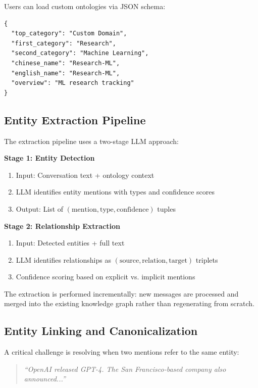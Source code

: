 Users can load custom ontologies via JSON schema:

\begin{verbatim}
{
  "top_category": "Custom Domain",
  "first_category": "Research",
  "second_category": "Machine Learning",
  "chinese_name": "Research-ML",
  "english_name": "Research-ML",
  "overview": "ML research tracking"
}
\end{verbatim}

\subsection{Entity Extraction Pipeline}

The extraction pipeline uses a two-stage LLM approach:

\textbf{Stage 1: Entity Detection}
\begin{enumerate}
    \item Input: Conversation text + ontology context
    \item LLM identifies entity mentions with types and confidence scores
    \item Output: List of $(\text{mention}, \text{type}, \text{confidence})$ tuples
\end{enumerate}

\textbf{Stage 2: Relationship Extraction}
\begin{enumerate}
    \item Input: Detected entities + full text
    \item LLM identifies relationships as $(\text{source}, \text{relation}, \text{target})$ triplets
    \item Confidence scoring based on explicit vs. implicit mentions
\end{enumerate}

The extraction is performed incrementally: new messages are processed and merged into the existing knowledge graph rather than regenerating from scratch.

\subsection{Entity Linking and Canonicalization}

A critical challenge is resolving when two mentions refer to the same entity:

\begin{quote}
\textit{``OpenAI released GPT-4. The San Francisco-based company also announced...''}
\end{quote}

